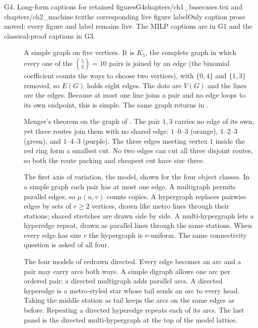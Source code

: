 \begin{offcut}{G4. Long-form captions for retained figures}{G4}{chapters/ch1\_basecases.tex and chapters/ch2\_machine.tex}{the corresponding live figure label}{Only caption prose moved: every figure and label remains live. The MILP captions are in G1 and the classical-proof captions in G3.}
\small
\begin{description}
\item[]
A simple graph on five vertices. It is $K_5$, the complete graph in which every one of the $\binom{5}{2}=10$ pairs is joined by an edge (the binomial coefficient counts the ways to choose two vertices), with $\{0,4\}$ and $\{1,3\}$ removed, so $E(G)$ holds eight edges. The dots are $V(G)$ and the lines are the edges. Because at most one line joins a pair and no edge loops to its own endpoint, this is simple. The same graph returns in .

\item[]
Menger's theorem on the graph of . The pair $1,3$ carries no edge of its own, yet three routes join them with no shared edge: $1$--$0$--$3$ (orange), $1$--$2$--$3$ (green), and $1$--$4$--$3$ (purple). The three edges meeting vertex $1$ inside the red ring form a smallest cut. No two edges can cut all three disjoint routes, so both the route packing and cheapest cut have size three.

\item[]
The first axis of variation, the model, shown for the four object classes. In a simple graph each pair has at most one edge. A multigraph permits parallel edges, so $\mu(u,v)$ counts copies. A hypergraph replaces pairwise edges by sets of $r\ge2$ vertices, drawn like metro lines through their stations; shared stretches are drawn side by side. A multi-hypergraph lets a hyperedge repeat, drawn as parallel lines through the same stations. When every edge has size $r$ the hypergraph is $r$-uniform. The same connectivity question is asked of all four.

\item[]
The four models of  redrawn directed. Every edge becomes an arc and a pair may carry arcs both ways. A simple digraph allows one arc per ordered pair; a directed multigraph adds parallel arcs. A directed hyperedge is a metro-styled star whose tail sends an arc to every head. Taking the middle station as tail keeps the arcs on the same edges as before. Repeating a directed hyperedge repeats each of its arcs. The last panel is the directed multi-hypergraph at the top of the model lattice.


\end{description}
\end{offcut}

